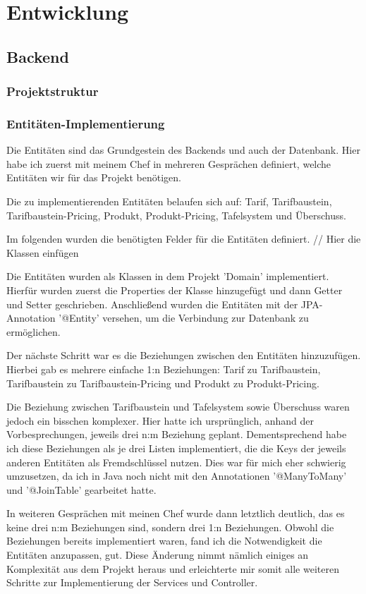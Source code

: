\chapter{Entwicklung}\label{ch:method}
\section{Backend}
\subsection{Projektstruktur}

\subsection{Entitäten-Implementierung}
Die Entitäten sind das Grundgestein des Backends und auch der Datenbank.
Hier habe ich zuerst mit meinem Chef in mehreren Gesprächen definiert, welche Entitäten wir für das Projekt benötigen.

Die zu implementierenden Entitäten belaufen sich auf: Tarif, Tarifbaustein, Tarifbaustein-Pricing, Produkt, Produkt-Pricing, Tafelsystem und Überschuss.

Im folgenden wurden die benötigten Felder für die Entitäten definiert. 
// Hier die Klassen einfügen

Die Entitäten wurden als Klassen in dem Projekt 'Domain' implementiert. Hierfür wurden zuerst die Properties der Klasse hinzugefügt und dann Getter und Setter geschrieben.
Anschließend wurden die Entitäten mit der JPA-Annotation '@Entity' versehen, um die Verbindung zur Datenbank zu ermöglichen.

Der nächste Schritt war es die Beziehungen zwischen den Entitäten hinzuzufügen. Hierbei gab es mehrere einfache 1:n Beziehungen: Tarif zu Tarifbaustein, Tarifbaustein zu Tarifbaustein-Pricing und Produkt zu Produkt-Pricing.

Die Beziehung zwischen Tarifbaustein und Tafelsystem sowie Überschuss waren jedoch ein bisschen komplexer. 
Hier hatte ich ursprünglich, anhand der Vorbesprechungen, jeweils drei n:m Beziehung geplant.
Dementsprechend habe ich diese Beziehungen als je drei Listen implementiert, die die Keys der jeweils anderen Entitäten als Fremdschlüssel nutzen.
Dies war für mich eher schwierig umzusetzen, da ich in Java noch nicht mit den Annotationen '@ManyToMany' und '@JoinTable' gearbeitet hatte.

In weiteren Gesprächen mit meinen Chef wurde dann letztlich deutlich, das es keine drei n:m Beziehungen sind, sondern drei 1:n Beziehungen.
Obwohl die Beziehungen bereits implementiert waren, fand ich die Notwendigkeit die Entitäten anzupassen, gut. Diese Änderung nimmt nämlich einiges an Komplexität aus dem Projekt heraus und
erleichterte mir somit alle weiteren Schritte zur Implementierung der Services und Controller.

